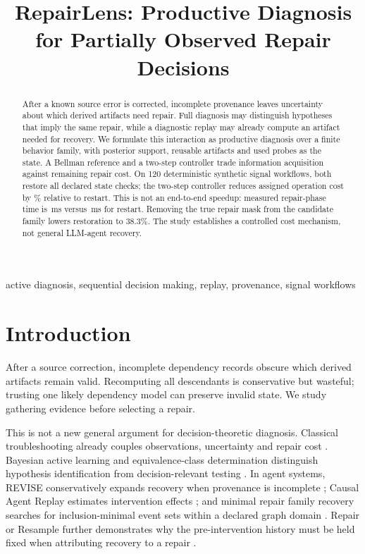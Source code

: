 \documentclass[10pt,letterpaper]{article}
\title{RepairLens: Productive Diagnosis for Partially Observed Repair Decisions}
\begin{document}
\maketitle
\begin{abstract}
After a known source error is corrected, incomplete provenance leaves uncertainty about which derived artifacts need repair. Full diagnosis may distinguish hypotheses that imply the same repair, while a diagnostic replay may already compute an artifact needed for recovery. We formulate this interaction as productive diagnosis over a finite behavior family, with posterior support, reusable artifacts and used probes as the state. A Bellman reference and a two-step controller trade information acquisition against remaining repair cost. On 120 deterministic synthetic signal workflows, both restore all declared state checks; the two-step controller reduces assigned operation cost by \RLTwoSaving\% relative to restart. This is not an end-to-end speedup: measured repair-phase time is \RLTwoTime\,ms versus \RLRestartTime\,ms for restart. Removing the true repair mask from the candidate family lowers restoration to 38.3\%. The study establishes a controlled cost mechanism, not general LLM-agent recovery.
\end{abstract}
\begin{keywords}
active diagnosis, sequential decision making, replay, provenance, signal workflows
\end{keywords}

\section{Introduction}
After a source correction, incomplete dependency records obscure which derived artifacts remain valid. Recomputing all descendants is conservative but wasteful; trusting one likely dependency model can preserve invalid state. We study gathering evidence before selecting a repair.

This is not a new general argument for decision-theoretic diagnosis. Classical troubleshooting already couples observations, uncertainty and repair cost \cite{trouble,experiment}. Bayesian active learning and equivalence-class determination distinguish hypothesis identification from decision-relevant testing \cite{ec2}. In agent systems, REVISE conservatively expands recovery when provenance is incomplete \cite{revise}; Causal Agent Replay estimates intervention effects \cite{car}; and minimal repair family recovery searches for inclusion-minimal event sets within a declared graph domain \cite{mrfr}. Repair or Resample further demonstrates why the pre-intervention history must be held fixed when attributing recovery to a repair \cite{resample}.
\end{document}
